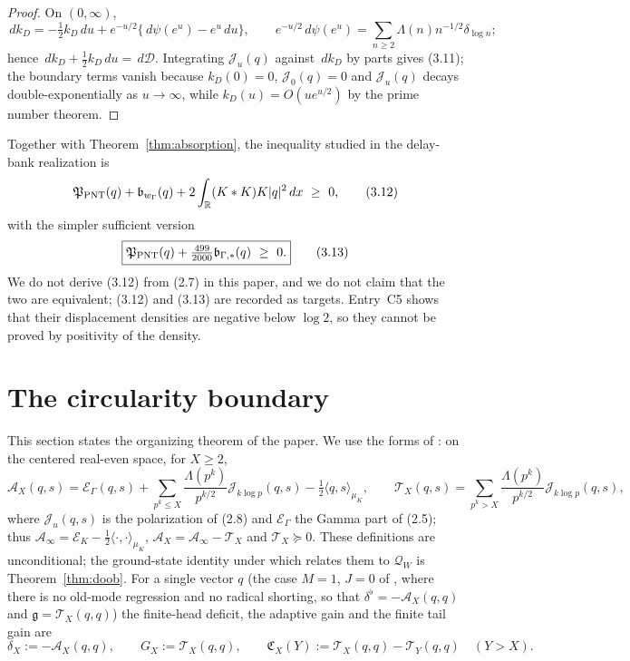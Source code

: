 \documentclass[11pt]{amsart}
\theoremstyle{definition}
\theoremstyle{remark}
\newcommand{\R}{\mathbb R}
\newcommand{\dd}{\,d}
\newcommand{\QW}{\mathcal Q_W}
\newcommand{\EK}{\mathscr E_K}
\begin{document}
\begin{proof}
On \((0,\infty)\),
\[
 \dd k_D=-\tfrac12k_D\dd u+e^{-u/2}\{\dd\psi(e^u)-e^u\dd u\},
 \qquad
 e^{-u/2}\dd\psi(e^u)=\sum_{n\ge2}\Lambda(n)n^{-1/2}\delta_{\log n};
\]
hence \(\dd k_D+\frac12k_D\dd u=\dd\mathcal D\).  Integrating
\(\mathcal J_u(q)\) against \(\dd k_D\) by parts gives (3.11); the
boundary terms vanish because \(k_D(0)=0\), \(\mathcal J_0(q)=0\) and
\(\mathcal J_u(q)\) decays double-exponentially as \(u\to\infty\), while
\(k_D(u)=O(ue^{u/2})\) by the prime number theorem.
\end{proof}

Together with Theorem~\ref{thm:absorption}, the inequality studied in the
delay-bank realization is
\[
 \mathfrak P_{\rm PNT}(q)+\mathfrak b_{w_\Gamma}(q)
 +2\int_\R(K*K)K|q|^2\dd x\ \ge\ 0,
\tag{3.12}
\]
with the simpler sufficient version
\[
 \boxed{\mathfrak P_{\rm PNT}(q)+\tfrac{499}{2000}\mathfrak b_{\Gamma,*}(q)\ \ge\ 0 .}
\tag{3.13}
\]
We do not derive (3.12) from (2.7) in this paper, and we do not claim
that the two are equivalent; (3.12) and (3.13) are recorded as targets.
Entry~C5 shows that their displacement densities are negative below
\(\log2\), so they cannot be proved by positivity of the density.

\section{The circularity boundary}
\label{sec:circularity}

This section states the organizing theorem of the paper.  We use the
forms of \cite[(9.2)--(9.4)]{TrejoPizzo40}: on the centered real-even
space, for \(X\ge2\),
\[
 \mathcal A_X(q,s)=\mathscr E_\Gamma(q,s)
 +\sum_{p^k\le X}\frac{\Lambda(p^k)}{p^{k/2}}\mathcal J_{k\log p}(q,s)
 -\tfrac12\langle q,s\rangle_{\mu_K},
 \qquad
 \mathcal T_X(q,s)=\sum_{p^k>X}\frac{\Lambda(p^k)}{p^{k/2}}
 \mathcal J_{k\log p}(q,s),
\]
where \(\mathcal J_u(q,s)\) is the polarization of (2.8) and
\(\mathscr E_\Gamma\) the Gamma part of (2.5); thus
\(\mathcal A_\infty=\EK-\frac12\langle\cdot,\cdot\rangle_{\mu_K}\),
\(\mathcal A_X=\mathcal A_\infty-\mathcal T_X\) and
\(\mathcal T_X\succeq0\).  These definitions are unconditional; the
ground-state identity under which \cite{TrejoPizzo40} relates them to
\(\QW\) is Theorem~\ref{thm:doob}.  For a single vector \(q\) (the case \(M=1\), \(J=0\) of
\cite[(9.25x), Theorem~9.11]{TrejoPizzo40}, where there is no old-mode
regression and no radical shorting, so that
\(\delta^\flat=-\mathcal A_X(q,q)\) and \(\mathfrak g=\mathcal T_X(q,q)\)) the finite-head deficit, the adaptive gain and the
finite tail gain are
\[
 \delta_X:=-\mathcal A_X(q,q),\qquad
 G_X:=\mathcal T_X(q,q),\qquad
 \mathfrak C_X(Y):=\mathcal T_X(q,q)-\mathcal T_Y(q,q)\quad(Y>X).
\]
\end{document}
